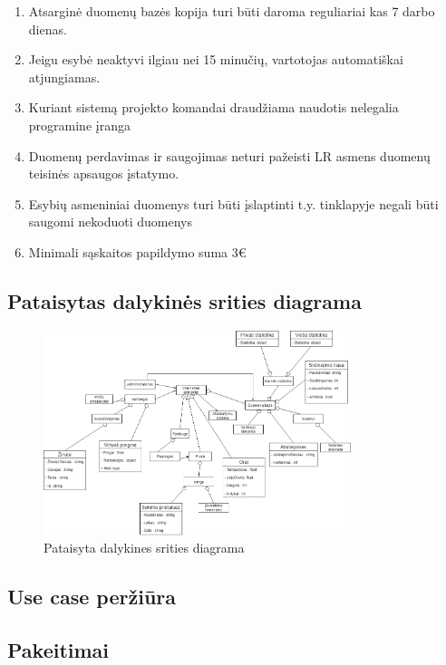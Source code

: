 \documentclass[oneside]{VUMIFPSkursinis}
\begin{document}
\begin{enumerate}
	\item Atsarginė duomenų bazės kopija turi būti daroma reguliariai kas 7 darbo dienas.
	\item Jeigu esybė neaktyvi ilgiau nei 15 minučių, vartotojas automatiškai atjungiamas.
	\item Kuriant sistemą projekto komandai draudžiama naudotis nelegalia programine įranga
	\item Duomenų perdavimas ir saugojimas neturi pažeisti LR asmens duomenų teisinės apsaugos įstatymo.
	\item Esybių asmeniniai duomenys turi būti įslaptinti t.y. tinklapyje negali būti saugomi nekoduoti duomenys
	\item Minimali sąskaitos papildymo suma 3€

\end{enumerate}


\pagebreak

\subsection{Pataisytas dalykinės srities diagrama}
\begin{figure}[h]
    \centering
    \includegraphics[width=0.80\textwidth]{DomainModelFixed.png}
    \caption{Pataisyta dalykines srities diagrama}
    \label{fig:Pataisyta dalykinės srities diagrama}
\end{figure}
\subsection{Use case peržiūra}


\subsection{Pakeitimai}
\end{document}
